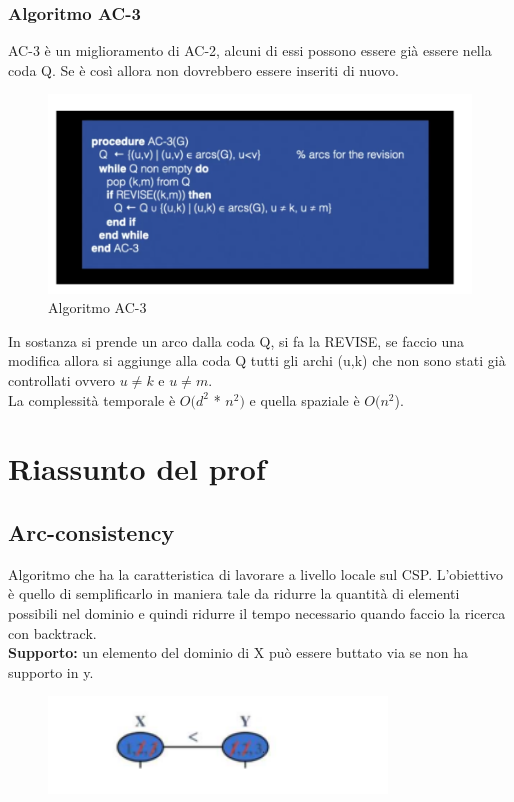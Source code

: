 \subsubsection{Algoritmo AC-3}
AC-3 è un miglioramento di AC-2, alcuni di essi possono essere già essere nella coda Q. Se è così allora non dovrebbero essere inseriti di nuovo.
\begin{figure}[H]
    \centering
    \includegraphics[width=13cm, keepaspectratio]{img/Cap3/ac-3.png}
    \caption{Algoritmo AC-3}
\end{figure}
In sostanza si prende un arco dalla coda Q, si fa la REVISE, se faccio una modifica allora si aggiunge alla coda Q tutti gli archi (u,k) che non sono stati già controllati ovvero $u \neq k$ e $u \neq m$.\\
La complessità temporale è $O(d^2$ * $n^2)$ e quella spaziale è $O(n^2$).

\section{Riassunto del prof}
\subsection{Arc-consistency}
Algoritmo che ha la caratteristica di lavorare a livello locale sul CSP. L'obiettivo è quello di semplificarlo in maniera tale da ridurre la quantità di elementi possibili nel dominio e quindi ridurre il tempo necessario quando faccio la ricerca con backtrack.
\\\textbf{Supporto: } un elemento del dominio di X può essere buttato via se non ha supporto in y.
\begin{figure}[H]
    \centering
    \includegraphics[width=9cm, keepaspectratio]{img/Cap3/riassunto1.png}
\end{figure}

